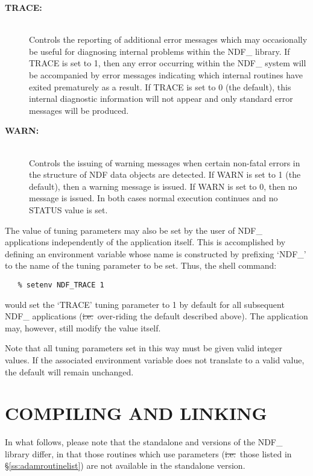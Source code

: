 \begin{description}
\item[{\bf TRACE:}]\mbox{}\\
Controls the reporting of additional error messages which may
occasionally be useful for diagnosing internal problems within the
NDF\_ library. If TRACE is set to 1, then any error occurring within
the NDF\_ system will be accompanied by error messages indicating
which internal routines have exited prematurely as a result. If TRACE
is set to 0 (the default), this internal diagnostic information will
not appear and only standard error messages will be produced.

\item[{\bf WARN:}]\mbox{}\\
Controls the issuing of warning messages when certain non-fatal errors
in the structure of NDF data objects are detected. If WARN is set to 1
(the default), then a warning message is issued. If WARN is set to 0,
then no message is issued.  In both cases normal execution continues
and no STATUS value is set.

\end{description}

The value of tuning parameters may also be set by the user of NDF\_
applications independently of the application itself. This is
accomplished by defining an environment variable whose name is
constructed by prefixing `NDF\_' to the name of the tuning parameter
to be set. Thus, the shell command:

\small
\begin{verbatim}
   % setenv NDF_TRACE 1
\end{verbatim}
\normalsize

would set the `TRACE' tuning parameter to 1 by default for all
subsequent NDF\_ applications (\st{i.e.}\ over-riding the default
described above). The application may, however, still modify the value
itself.

Note that all tuning parameters set in this way must be given valid
integer values. If the associated environment variable does not
translate to a valid value, the default will remain unchanged.

\section{\label{ss:compilingandlinking}COMPILING AND LINKING}

In what follows, please note that the standalone and
 versions of
the NDF\_ library differ, in that those routines which use parameters
(\st{i.e.}\ those listed in \S\ref{ss:adamroutinelist}) are not
available in the standalone version.

